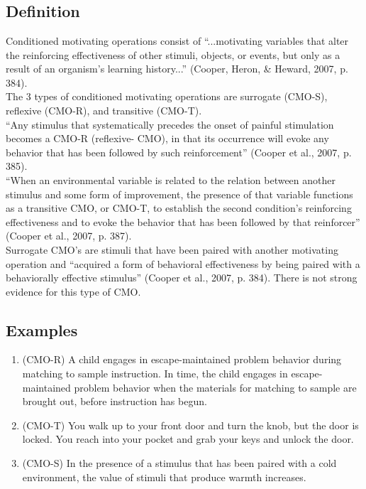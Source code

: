 \clearpage \section[\fourFKTwentyEight{}]{\fourFKTwentyEight{}%
              }
\subsection{Definition}
Conditioned motivating operations consist of ``...motivating variables that alter the reinforcing effectiveness of other stimuli, objects, or events, but only as a result of an organism's learning history...'' (Cooper, Heron, \& Heward, 2007, p. 384).\\

The 3 types of conditioned motivating operations are surrogate (CMO-S), reflexive (CMO-R), and transitive (CMO-T).\\

``Any stimulus that systematically precedes the onset of painful stimulation becomes a CMO-R (reflexive- CMO), in that its occurrence will evoke any behavior that has been followed by such reinforcement'' (Cooper et al., 2007, p. 385).\\

``When an environmental variable is related to the relation between another stimulus and some form of improvement, the presence of that variable functions as a transitive CMO, or CMO-T, to establish the second condition's reinforcing effectiveness and to evoke the behavior that has been followed by that reinforcer'' (Cooper et al., 2007, p. 387).\\

Surrogate CMO's are stimuli that have been paired with another motivating operation and ``acquired a form of behavioral effectiveness by being paired with a behaviorally effective stimulus'' (Cooper et al., 2007, p. 384). There is not strong evidence for this type of CMO.
%
\subsection{Examples}
\begin{enumerate}
\item (CMO-R) A child engages in escape-maintained problem behavior during matching to sample instruction. In time, the child engages in escape-maintained problem behavior when the materials for matching to sample are brought out, before instruction has begun. 
\item (CMO-T) You walk up to your front door and turn the knob, but the door is locked. You reach into your pocket and grab your keys and unlock the door. 
\item (CMO-S) In the presence of a stimulus that has been paired with a cold environment, the value of stimuli that produce warmth increases.
%
\end{enumerate}
%
